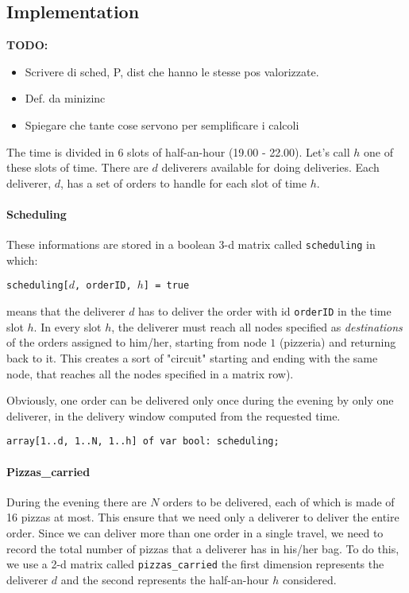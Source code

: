 \documentclass[10pt]{article}
\begin{document}
	\subsection{Implementation}


	\textbf{TODO:} 
	\begin{itemize}
		\item Scrivere di sched, P, dist che hanno le stesse pos valorizzate.
		\item Def. da minizinc
		\item Spiegare che tante cose servono per semplificare i calcoli
	\end{itemize}
	
	The time is divided in 6 slots of half-an-hour (19.00 - 22.00). Let's call
	$h$ one of these slots of time.
	There are $d$ deliverers available for doing deliveries.
	Each deliverer, $d$, has a set of orders to handle for each slot of time $h$.

    \paragraph*{Scheduling}
	These informations are stored in a boolean 3-d matrix called 
	\texttt{scheduling} in which: 
	
	\begin{center}
		\texttt{scheduling[$d$, orderID, $h$] = true}
	\end{center}
	
	means that the deliverer $d$ has to deliver the order with id 
	\texttt{orderID} in the time slot $h$. In every slot $h$, the deliverer must 
	reach all nodes specified as \textit{destinations} of the orders assigned to 
	him/her, starting from node $1$ (pizzeria) and returning back to it. This creates
	 a sort of "circuit" starting and ending with the same node, that reaches all the 
	nodes specified in a matrix row).

	Obviously, one order can be delivered only once during the evening by only
	one deliverer, in the delivery window computed from the requested time.

	\begin{center}
		\texttt{array[1..d, 1..N, 1..h] of var bool: scheduling;}
	\end{center}

	\paragraph*{Pizzas\_carried}
	During the evening there are $N$ orders to be delivered, each of which is made of
	16 pizzas at most. This ensure that we need only a deliverer to deliver the 
	entire order.
	Since we can deliver more than one order in a single travel, we need to
	record the total number of pizzas that a deliverer has in his/her bag.
	To do this, we use a 2-d matrix called \texttt{pizzas\_carried}
	the first dimension represents the deliverer $d$ and the second 
	represents the half-an-hour $h$ considered.
\end{document}

